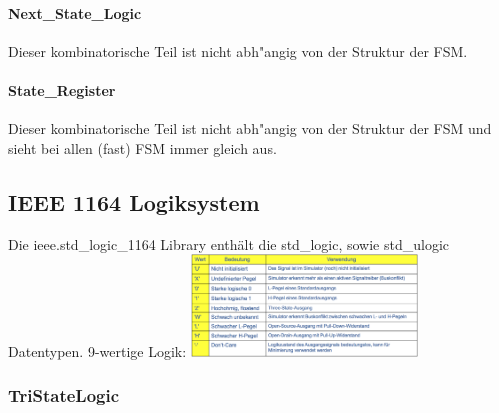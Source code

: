 \begin{multicols}{2}
	\paragraph{Next\_State\_Logic} 
	Dieser kombinatorische Teil ist nicht abh"angig von der Struktur der FSM.
	
	\vfill\null
	\columnbreak
	\paragraph{State\_Register}  
	Dieser kombinatorische Teil ist nicht abh"angig von der Struktur der 
	FSM und sieht bei allen (fast) FSM immer gleich aus.
	
\end{multicols}

\begin{multicols}{2}
	\subsection{IEEE 1164 Logiksystem}
	Die ieee.std\_logic\_1164 Library enthält die std\_logic, sowie std\_ulogic Datentypen. 9-wertige Logik:
	\includegraphics[width=0.45\textwidth]{images/ieee1164logicsystem}
	
	\vfill\null
	\columnbreak
	\subsubsection{TriStateLogic}
	
\end{multicols}

